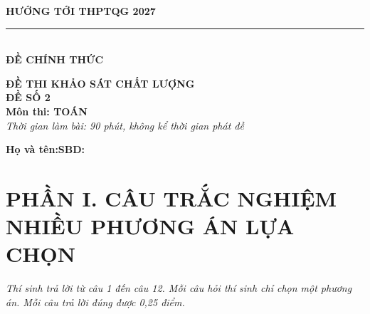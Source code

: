 \documentclass[12pt,a4paper]{article}
\begin{document}
\noindent
\begin{minipage}[t]{0.40\textwidth}
    \centering
    \textbf{HƯỚNG TỚI THPTQG 2027}\\[-2pt]
    \rule{3.2cm}{0.6pt}\\[4pt]
    \textbf{ĐỀ CHÍNH THỨC}
\end{minipage}\hfill
\begin{minipage}[t]{0.58\textwidth}
    \centering
    \textbf{ĐỀ THI KHẢO SÁT CHẤT LƯỢNG}\\
    \textbf{ĐỀ SỐ 2}\\
    \textbf{Môn thi: TOÁN}\\
    \textit{\small Thời gian làm bài: 90 phút, không kể thời gian phát đề}
\end{minipage}

\vspace{0.2cm}
\noindent
\begin{minipage}[b]{0.78\textwidth}
    \textbf{Họ và tên:}\dotfill\textbf{SBD:}\makebox[3.5cm]{\dotfill}
\end{minipage}\hfill
\begin{minipage}[b]{0.20\textwidth}
    \hfill
    \setlength{\fboxrule}{0.8pt}%
\end{minipage}
\vspace{0.2cm}

\section*{\large PHẦN I. CÂU TRẮC NGHIỆM NHIỀU PHƯƠNG ÁN LỰA CHỌN}
\textit{Thí sinh trả lời từ câu 1 đến câu 12. Mỗi câu hỏi thí sinh chỉ chọn một phương án. Mỗi câu trả lời đúng được 0,25 điểm.}
\end{document}
